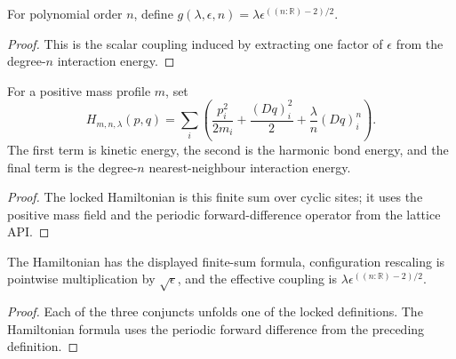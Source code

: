 \begin{definition}
\label{def:hamiltonian:effective-coupling}
For polynomial order $n$, define
$g(\lambda,\epsilon,n)=\lambda\epsilon^{((n: \mathbb R)-2)/2}$.
\end{definition}
\begin{proof}

\leanok
This is the scalar coupling induced by extracting one factor of $\epsilon$
from the degree-$n$ interaction energy.
\end{proof}

\begin{definition}
\label{def:hamiltonian:lattice-hamiltonian}
For a positive mass profile $m$, set
\[
 H_{m,n,\lambda}(p,q)=\sum_i\left(
 \frac{p_i^2}{2m_i}+\frac{(Dq)_i^2}{2}
 +\frac{\lambda}{n}(Dq)_i^n\right).
\]
The first term is kinetic energy, the second is the harmonic bond energy, and
the final term is the degree-$n$ nearest-neighbour interaction energy.
\end{definition}
\begin{proof}

\leanok
The locked Hamiltonian is this finite sum over cyclic sites; it uses the
positive mass field and the periodic forward-difference operator from the
lattice API.
\end{proof}

\begin{theorem}
\label{thm:hamiltonian:rescaling-data}
The Hamiltonian has the displayed finite-sum formula, configuration rescaling
is pointwise multiplication by $\sqrt\epsilon$, and the effective coupling is
$\lambda\epsilon^{((n:\mathbb R)-2)/2}$.
\end{theorem}
\begin{proof}

\leanok
Each of the three conjuncts unfolds one of the locked definitions.  The
Hamiltonian formula uses the periodic forward difference from the preceding
definition.
\end{proof}

